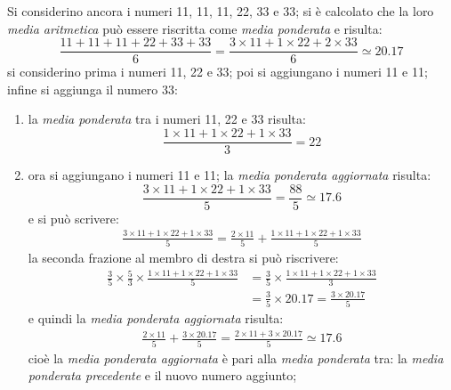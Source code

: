 \documentclass[12pt,a4paper]{article}
\begin{document}
Si considerino  ancora i  numeri \num{11}, \num{11},  \num{11}, \num{22},  \num{33} e
\num{33}; si  è calcolato che  la loro  \emph{media aritmetica} può  essere riscritta
come \emph{media ponderata} e risulta:
\begin{equation*}
  \frac{\num{11} + \num{11} + \num{11} + \num{22} + \num{33} + \num{33}}{6}
  = \frac{\num{3} \times{} \num{11}
     + \num{1} \times{} \num{22}
     + \num{2} \times{} \num{33}}
  {6} \simeq \num{20,17}
\end{equation*}
si considerino  prima i  numeri \num{11},  \num{22} e \num{33};  poi si  aggiungano i
numeri \num{11} e \num{11}; infine si aggiunga il numero \num{33}:
\begin{enumerate}
\item la \emph{media ponderata} tra i numeri \num{11}, \num{22} e \num{33} risulta:
  \begin{equation*}
    \frac{\num{1} \times{} \num{11}
       + \num{1} \times{} \num{22}
       + \num{1} \times{} \num{33}}{\num{3}}
    = \num{22}
  \end{equation*}

\item  ora si  aggiungano  i numeri  \num{11} e  \num{11};  la \emph{media  ponderata
     aggiornata} risulta:
  \begin{equation*}
    \frac{\num{3} \times{} \num{11}
       + \num{1} \times{} \num{22}
       + \num{1} \times{} \num{33}}{\num{5}}
    = \frac{\num{88}}{\num{5}} \simeq \num{17,6}
  \end{equation*}
  e si può scrivere:
  \begin{align*}
    \frac{\num{3} \times{} \num{11}
    + \num{1} \times{} \num{22}
    + \num{1} \times{} \num{33}}{\num{5}}
    = \frac{\num{2} \times{} \num{11}}{\num{5}}
    + \frac{\num{1} \times{} \num{11}
    + \num{1} \times{} \num{22}
    + \num{1} \times{} \num{33}}{\num{5}}
  \end{align*}
  la seconda frazione al membro di destra si può riscrivere:
  \begin{align*}
    \frac{\num{3}}{\num{5}} \times \frac{\num{5}}{\num{3}} \times
    \frac{\num{1} \times{} \num{11}
    + \num{1} \times{} \num{22}
    + \num{1} \times{} \num{33}}{\num{5}}
    &= \frac{\num{3}}{\num{5}} \times
      \frac{\num{1} \times{} \num{11}
      + \num{1} \times{} \num{22}
      + \num{1} \times{} \num{33}}{\num{3}} \\
    &= \frac{\num{3}}{\num{5}} \times{} \num{20,17}
      = \frac{\num{3} \times{} \num{20,17}}{\num{5}}
  \end{align*}
  e quindi la \emph{media ponderata aggiornata} risulta:
  \begin{align*}
    \frac{\num{2} \times{} \num{11}}{\num{5}}
    + \frac{\num{3} \times{} \num{20,17}}{\num{5}}
    = \frac{\num{2} \times{} \num{11} + \num{3} \times{} \num{20,17}}{\num{5}}
    \simeq \num{17,6}
  \end{align*}
  cioè la \emph{media  ponderata aggiornata} è pari alla  \emph{media ponderata} tra:
  la \emph{media ponderata precedente} e il nuovo numero aggiunto;


\end{enumerate}
\end{document}
